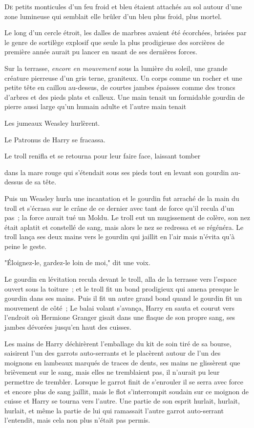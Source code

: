 
\lettrine{D}{e} petits monticules d'un feu froid et bleu étaient attachés au sol autour d'une zone lumineuse qui semblait elle brûler d'un bleu plus froid, plus mortel.

Le long d'un cercle étroit, les dalles de marbres avaient été écorchées, brisées par le genre de sortilège explosif que seule la plus prodigieuse des sorcières de première année aurait pu lancer en usant de ses dernières forces.

Sur la terrasse, \emph{encore en mouvement} sous la lumière du soleil, une grande créature pierreuse d'un gris terne, graniteux. Un corps comme un rocher et une petite tête en caillou au-dessus, de courtes jambes épaisses comme des troncs d'arbres et des pieds plats et calleux. Une main tenait un formidable gourdin de pierre aussi large qu'un humain adulte et l'autre main tenait

Les jumeaux Weasley hurlèrent.

Le Patronus de Harry se fracassa.

Le troll renifla et se retourna pour leur faire face, laissant tomber

dans la mare rouge qui s'étendait sous ses pieds tout en levant son gourdin au-dessus de sa tête.

Puis un Weasley hurla une incantation et le gourdin fut arraché de la main du troll et s'écrasa sur le crâne de ce dernier avec tant de force qu'il recula d'un pas~; la force aurait tué un Moldu. Le troll eut un mugissement de colère, son nez était aplatit et constellé de sang, mais alors le nez se redressa et se régénéra. Le troll lança ses deux mains vers le gourdin qui jaillit en l'air mais n'évita qu'à peine le geste.

"Éloignez-le, gardez-le loin de moi," dit une voix.

Le gourdin en lévitation recula devant le troll, alla de la terrasse vers l'espace ouvert sous la toiture~; et le troll fit un bond prodigieux qui amena presque le gourdin dans ses mains. Puis il fit un autre grand bond quand le gourdin fit un mouvement de côté~; Le balai volant s'avança, Harry en sauta et courut vers l'endroit où Hermione Granger gisait dans une flaque de son propre sang, ses jambes dévorées jusqu'en haut des cuisses.

Les mains de Harry déchirèrent l'emballage du kit de soin tiré de sa bourse, saisirent l'un des garrots auto-serrants et le placèrent autour de l'un des moignons en lambeaux marqués de traces de dents, ses mains ne glissèrent que brièvement sur le sang, mais elles ne tremblaient pas, il n'aurait pu leur permettre de trembler. Lorsque le garrot finit de s'enrouler il se serra avec force et encore plus de sang jaillit, mais le flot s'interrompit soudain sur ce moignon de cuisse et Harry se tourna vers l'autre. Une partie de son esprit hurlait, hurlait, hurlait, et même la partie de lui qui ramassait l'autre garrot auto-serrant l'entendit, mais cela non plus n'était pas permis.

